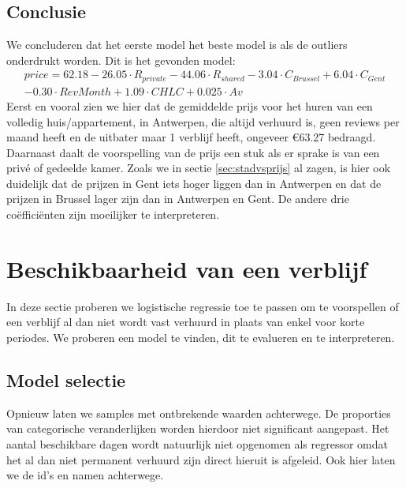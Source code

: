 \documentclass[a4paper,kulak]{kulakarticle} %
\begin{document}
\subsection{Conclusie}
We concluderen dat het eerste model het beste model is als de outliers onderdrukt worden. Dit is het gevonden model:
\begin{multline}
price = 62.18 - 26.05\cdot R_{private}  - 44.06\cdot R_{shared}  - 3.04\cdot C_{Brussel} + 6.04\cdot C_{Gent} \\ - 0.30\cdot RevMonth + 1.09\cdot CHLC + 0.025 \cdot Av 
\end{multline}
Eerst en vooral zien we hier dat de gemiddelde prijs voor het huren van een volledig huis/appartement, in Antwerpen, die altijd verhuurd is, geen reviews per maand heeft en de uitbater maar 1 verblijf heeft, ongeveer \euro  63.27 bedraagd. Daarnaast daalt de voorspelling van de prijs een stuk als er sprake is van een priv\'e of gedeelde kamer. Zoals we in sectie \ref{sec:stadvsprijs} al zagen, is hier ook duidelijk dat de prijzen in Gent iets hoger liggen dan in Antwerpen en dat de prijzen in Brussel lager zijn dan in Antwerpen en Gent. De andere drie co\"effici\"enten zijn moeilijker te interpreteren.

\section{Beschikbaarheid van een verblijf}
In deze sectie proberen we logistische regressie toe te passen om te voorspellen of een verblijf al dan niet wordt vast verhuurd in plaats van enkel voor korte periodes.
We proberen een model te vinden, dit te evalueren en te interpreteren.
\subsection{Model selectie}
Opnieuw laten we samples met ontbrekende waarden achterwege.
De proporties van categorische veranderlijken worden hierdoor niet significant aangepast.
Het aantal beschikbare dagen wordt natuurlijk niet opgenomen als regressor omdat het al dan niet permanent verhuurd zijn direct hieruit is afgeleid. Ook hier laten we de id's en namen achterwege.
\end{document}
